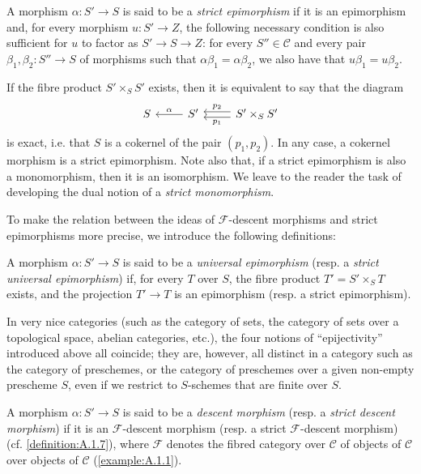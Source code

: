 \documentclass{article}
\theoremstyle{plain}
\theoremstyle{definition}
\newenvironment{definition}[1]
  {\renewcommand\theinnercustomdefinition{#1}\innercustomdefinition}
  {\endinnercustomdefinition}
\newcommand{\sh}[1]{{\mathscr{#1}}}
\newcommand{\cat}[1]{{\mathcal{#1}}}
\newcommand{\oldpage}[1]{\marginpar{\footnotesize$\Big\vert$ \textit{p.~#1}}}
\begin{document}
\begin{definition}{2.2}
\label{definition:A.2.2}
  A morphism $\alpha\colon S'\to S$ is said to be a \emph{strict epimorphism} if it is an epimorphism and, for every morphism $u\colon S'\to Z$, the following necessary condition is also sufficient for $u$ to factor as $S'\to S\to Z$:
  for every $S''\in\cat{C}$ and every pair $\beta_1,\beta_2\colon S''\to S$ of morphisms such that $\alpha\beta_1=\alpha\beta_2$, we also have that $u\beta_1=u\beta_2$.
\end{definition}

If the fibre product $S'\times_S S'$ exists, then it is equivalent to say that the diagram
\[
  \begin{tikzcd}
    S
    & S' \lar[swap,"\alpha"]
    & S'\times_S S'\lar[shift left=1,"p_1"] \lar[shift right=1,swap,"p_2"]
  \end{tikzcd}
\]
\oldpage{190-07}
is exact, i.e. that $S$ is a cokernel of the pair $(p_1,p_2)$.
In any case, a cokernel morphism is a strict epimorphism.
Note also that, if a strict epimorphism is also a monomorphism, then it is an isomorphism.
We leave to the reader the task of developing the dual notion of a \emph{strict monomorphism}.

To make the relation between the ideas of $\sh{F}$-descent morphisms and strict epimorphisms more precise, we introduce the following definitions:

\begin{definition}{2.3}
  A morphism $\alpha\colon S'\to S$ is said to be a \emph{universal epimorphism} (resp. a \emph{strict universal epimorphism}) if, for every $T$ over $S$, the fibre product $T'=S'\times_S T$ exists, and the projection $T'\to T$ is an epimorphism (resp. a strict epimorphism).
\end{definition}

In very nice categories (such as the category of sets, the category of sets over a topological space, abelian categories, etc.), the four notions of ``epijectivity'' introduced above all coincide;
they are, however, all distinct in a category such as the category of preschemes, or the category of preschemes over a given non-empty prescheme $S$, even if we restrict to $S$-schemes that are finite over $S$.

\begin{definition}{2.4}
  A morphism $\alpha\colon S'\to S$ is said to be a \emph{descent morphism} (resp. a \emph{strict descent morphism}) if it is an $\sh{F}$-descent morphism (resp. a strict $\sh{F}$-descent morphism) (cf. \cref{definition:A.1.7}), where $\sh{F}$ denotes the fibred category over $\cat{C}$ of objects of $\cat{C}$ over objects of $\cat{C}$ (\cref{example:A.1.1}).
\end{definition}
\end{document}
